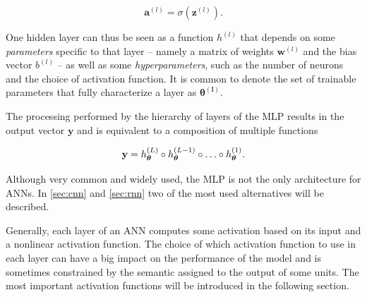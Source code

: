 \begin{equation}\label{eq:MLP_activation}
    \mathbf{a}^{(l)} = \sigma(\mathbf{z}^{(l)}).
\end{equation}

One hidden layer can thus be seen as a function $h^{(l)}$ that depends on some
\emph{parameters} specific to that layer -- namely a matrix of weights
$\mathbf{w}^{(l)}$ and the bias vector $b^{(l)}$ -- as well as some
\emph{hyperparameters}, such as the number of neurons and the choice of
activation function. It is common to denote the set of trainable parameters
that fully characterize a layer as $\boldsymbol{\theta^{(l)}}$.

The processing performed by the hierarchy of layers of the MLP results in the
output vector $\mathbf{y}$ and is equivalent to a composition of multiple
functions

\begin{equation}\label{eq:fn_composition}
    \textbf{y} = h^{(L)}_{\boldsymbol{\theta}} \composition
        h^{(L-1)}_{\boldsymbol{\theta}} \composition
        \dots \composition h^{(1)}_{\boldsymbol{\theta}}.
\end{equation}

\noindent Although very common and widely used, the MLP is not the only
architecture for ANNs. In \autoref{sec:cnn} and \autoref{sec:rnn} two of the
most used alternatives will be described.

Generally, each layer of an ANN computes some activation based on its input and
a nonlinear activation function. The choice of which activation function to use
in each layer can have a big impact on the performance of the model and is
sometimes constrained by the semantic assigned to the output of some units. The
most important activation functions will be introduced in the following
section.

